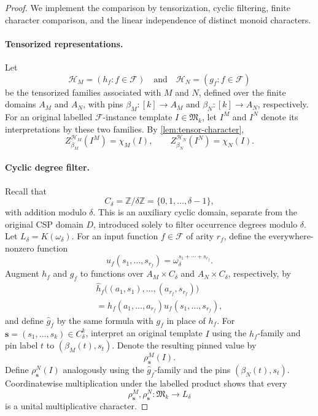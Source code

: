 \documentclass[11pt]{article}
\theoremstyle{plain}
\theoremstyle{definition}
\theoremstyle{remark}
\newcommand{\cF}{\mathcal F}
\newcommand{\InstMonoid}[1]{\mathfrak M_{#1}}
\begin{document}
\begin{proof}
We implement the comparison by tensorization, cyclic filtering, finite
character comparison, and the linear independence of distinct monoid
characters.

\paragraph{Tensorized representations.}
Let
\[
  \mathcal H_M=(h_f:f\in\cF)
  \quad\text{and}\quad
  \mathcal H_N=(g_f:f\in\cF)
\]
be the tensorized families associated with $M$ and $N$, defined over the
finite domains $A_M$ and $A_N$, with pins
$\beta_M:[k]\to A_M$ and $\beta_N:[k]\to A_N$, respectively.  For an
original labelled $\cF$-instance template $I\in\InstMonoid{k}$, let $I^M$
and $I^N$ denote its interpretations by these two families.  By
\cref{lem:tensor-character},
\begin{equation}
  Z_{\beta_M}^{\mathcal H_M}(I^M)=\chi_M(I),
  \qquad
  Z_{\beta_N}^{\mathcal H_N}(I^N)=\chi_N(I).
  \label{eq:degree-filter-monomial-realizations}
\end{equation}

\paragraph{Cyclic degree filter.}
Recall that
\[
  C_\delta=\mathbb Z/\delta\mathbb Z
  =\{0,1,\ldots,\delta-1\},
\]
with addition modulo $\delta$.  This is an auxiliary cyclic domain, separate
from the original CSP domain $D$, introduced solely to filter occurrence
degrees modulo $\delta$.  Let $L_\delta=K(\omega_\delta)$.  For an input
function $f\in\cF$ of arity
$r_f$, define the everywhere-nonzero function
\begin{equation*}
  u_f(s_1,\ldots,s_{r_f})
  =\omega_\delta^{s_1+\cdots+s_{r_f}}.
\end{equation*}
Augment $h_f$ and $g_f$ to functions over
$A_M\times C_\delta$ and $A_N\times C_\delta$, respectively, by
\begin{multline*}
  \widehat h_f\bigl((a_1,s_1),\ldots,(a_{r_f},s_{r_f})\bigr)\\
  =h_f(a_1,\ldots,a_{r_f})
     u_f(s_1,\ldots,s_{r_f}),
\end{multline*}
and define $\widehat g_f$ by the same formula with $g_f$ in place of $h_f$.
For $\mathbf s=(s_1,\ldots,s_k)\in C_\delta^k$, interpret an original
template $I$ using the $\widehat h_f$-family and pin label $t$ to
$(\beta_M(t),s_t)$.  Denote the resulting pinned value by
\[
  \rho^M_{\mathbf s}(I).
\]
Define $\rho^N_{\mathbf s}(I)$ analogously using the $\widehat g_f$-family
and the pins $(\beta_N(t),s_t)$.  Coordinatewise multiplication under the
labelled product shows that every
\[
  \rho^M_{\mathbf s},\rho^N_{\mathbf s}:
  \InstMonoid{k}\to L_\delta
\]
is a unital multiplicative character.


\end{proof}
\end{document}
